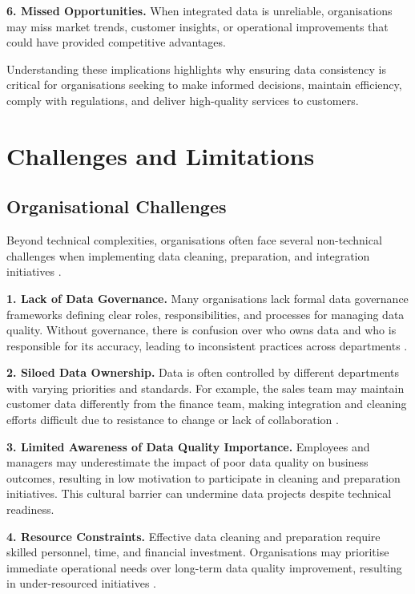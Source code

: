 \textbf{6. Missed Opportunities.}  
When integrated data is unreliable, organisations may miss market trends, customer insights, or operational improvements that could have provided competitive advantages.

Understanding these implications highlights why ensuring data consistency is critical for organisations seeking to make informed decisions, maintain efficiency, comply with regulations, and deliver high-quality services to customers.

\section{Challenges and Limitations}

\subsection{Organisational Challenges}

Beyond technical complexities, organisations often face several non-technical challenges when implementing data cleaning, preparation, and integration initiatives \cite{strong1997data}.

\textbf{1. Lack of Data Governance.}  
Many organisations lack formal data governance frameworks defining clear roles, responsibilities, and processes for managing data quality. Without governance, there is confusion over who owns data and who is responsible for its accuracy, leading to inconsistent practices across departments \cite{otto2011data}.

\textbf{2. Siloed Data Ownership.}  
Data is often controlled by different departments with varying priorities and standards. For example, the sales team may maintain customer data differently from the finance team, making integration and cleaning efforts difficult due to resistance to change or lack of collaboration \cite{khatri2010data}.

\textbf{3. Limited Awareness of Data Quality Importance.}  
Employees and managers may underestimate the impact of poor data quality on business outcomes, resulting in low motivation to participate in cleaning and preparation initiatives. This cultural barrier can undermine data projects despite technical readiness.

\textbf{4. Resource Constraints.}  
Effective data cleaning and preparation require skilled personnel, time, and financial investment. Organisations may prioritise immediate operational needs over long-term data quality improvement, resulting in under-resourced initiatives \cite{madnick2009overview}.

